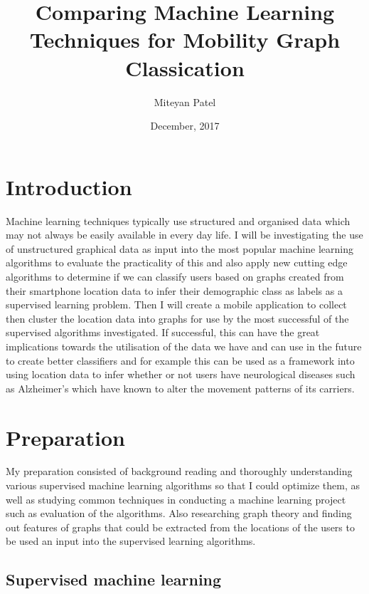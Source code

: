 \documentclass[withindex,glossary]{cam-thesis}
\title{Comparing Machine Learning Techniques for Mobility
Graph Classication}
\author{Miteyan Patel}
\date{December, 2017}
\begin{document}
\frontmatter{}

\chapter{Introduction}

Machine learning techniques typically use structured and organised data which may not always be easily available in every day life. I will be investigating the use of unstructured graphical data as input into the most popular machine learning algorithms to evaluate the practicality of this and also apply new cutting edge algorithms to determine if we can classify users based on graphs created from their smartphone location data to infer their demographic class as labels as a supervised learning problem. Then I will create a mobile application to collect then cluster the location data into graphs for use by the most successful of the supervised algorithms investigated. If successful, this can have the great implications towards the utilisation of the data we have and can use in the future to create better classifiers and for example this can be used as a framework into using location data to infer whether or not users have neurological diseases such as Alzheimer’s which have known to alter the movement patterns of its carriers.


\chapter{Preparation}

My preparation consisted of background reading and thoroughly understanding various
supervised machine learning algorithms so that I could optimize them, as well as studying common techniques in conducting a machine learning project such as evaluation of the algorithms. Also researching graph theory and finding out features of graphs that could be extracted from the locations of the users to be used an input into the supervised learning algorithms.


\section{Supervised machine learning}
\end{document}
